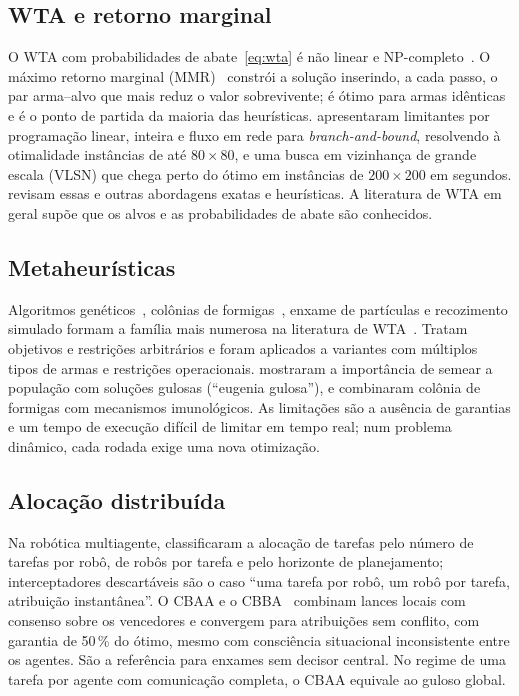 \documentclass[11pt,a4paper]{article}
\begin{document}
\subsection{WTA e retorno marginal}
O WTA com probabilidades de abate~\eqref{eq:wta} é não linear e NP-completo~\cite{lloyd1986}. O máximo retorno marginal
(MMR)~\cite{denbroeder1959} constrói a solução inserindo, a cada passo, o par arma--alvo que mais reduz o valor
sobrevivente; é ótimo para armas idênticas e é o ponto de partida da maioria das heurísticas. \citet{ahuja2007}
apresentaram limitantes por programação linear, inteira e fluxo em rede para \emph{branch-and-bound}, resolvendo à
otimalidade instâncias de até $80\times80$, e uma busca em vizinhança de grande escala (VLSN) que chega perto do ótimo
em instâncias de $200\times200$ em segundos. \citet{kline2019} revisam essas e outras abordagens exatas e heurísticas. A
literatura de WTA em geral supõe que os alvos e as probabilidades de abate são conhecidos.

\subsection{Metaheurísticas}
Algoritmos genéticos~\cite{lee2003ga}, colônias de formigas~\cite{lee2002aco}, enxame de partículas e recozimento
simulado formam a família mais numerosa na literatura de WTA~\cite{kline2019}. Tratam objetivos e restrições arbitrários
e foram aplicados a variantes com múltiplos tipos de armas e restrições operacionais. \citet{lee2003ga} mostraram a
importância de semear a população com soluções gulosas (``eugenia gulosa''), e \citet{lee2002aco} combinaram colônia de
formigas com mecanismos imunológicos. As limitações são a ausência de garantias e um tempo de execução difícil de limitar
em tempo real; num problema dinâmico, cada rodada exige uma nova otimização.

\subsection{Alocação distribuída}
Na robótica multiagente, \citet{gerkey2004} classificaram a alocação de tarefas pelo número de tarefas por robô, de
robôs por tarefa e pelo horizonte de planejamento; interceptadores descartáveis são o caso ``uma tarefa por robô, um robô
por tarefa, atribuição instantânea''. O CBAA e o CBBA~\cite{choi2009} combinam lances locais com consenso sobre os
vencedores e convergem para atribuições sem conflito, com garantia de 50\,\% do ótimo, mesmo com consciência situacional
inconsistente entre os agentes. São a referência para enxames sem decisor central. No regime de uma tarefa por agente
com comunicação completa, o CBAA equivale ao guloso global.
\end{document}
